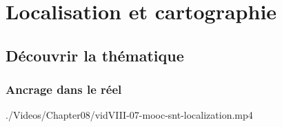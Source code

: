 \section[Localisation et cartographie]{Localisation et cartographie}
\label{sec:VIII.4}


\subsection[Découvrir la thématique]{Découvrir la thématique}
\label{sub:VIII.4.1}

\subsubsection[Ancrage dans le réel]{Ancrage dans le réel}
\label{subsub:VIII.4.1.1}


\begin{marginvideo}
		{./Videos/Chapter08/vidVIII-07-mooc-snt-localization.mp4}%
\end{marginvideo}

